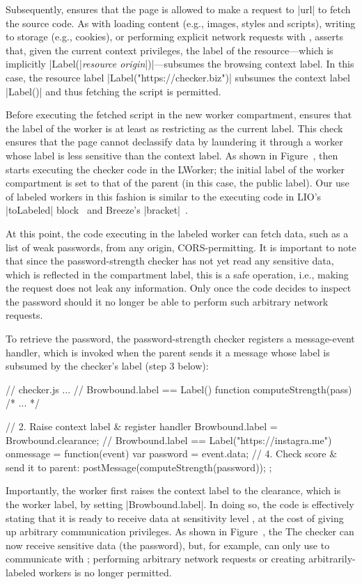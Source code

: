Subsequently, \sys{} ensures that the page is allowed to make
a request to \js|url| to fetch the source code.
%
As with loading content (e.g., images, styles and scripts), writing to
storage (e.g., cookies), or performing explicit network requests with
\xhr{}, \sys{} asserts that, given the current context privileges, the
label of the resource---which is implicitly \js|Label(|\emph{resource
origin}\js|)|---subsumes the browsing context label.
%
In this case, the resource label \js|Label("https://checker.biz")|
subsumes the context label \js|Label()| and thus fetching the script
is permitted.

Before executing the fetched script in the new worker compartment, \sys{}
ensures that the label of the worker is at least as restricting as the
current label.
%
This check ensures that the page cannot declassify data by laundering
it through a worker whose label is less sensitive than the context
label.
%
\iffigures
As shown in Figure~, 
\fi
\sys{} then starts
executing the checker code in the LWorker; the initial label of the
worker compartment is set to that of the parent (in this case, the
public label).
%
Our use of labeled workers in this fashion is similar to the executing code in
LIO's \js|toLabeled| block~\cite{stefan:2011:flexible} and Breeze's
\js|bracket|~\cite{Breeze13}.
 
At this point, the code executing in the labeled worker can fetch
data, such as a list of weak passwords, from any origin,
CORS-permitting.
%
It is important to note that since the password-strength checker has
not yet read any sensitive data, which is reflected in the compartment
label, this is a safe operation, i.e., making the request does not
leak any information.
%
Only once the code decides to inspect the password should it no
longer be able to perform such arbitrary network requests.

To retrieve the password, the password-strength checker registers a
message-event handler, which is invoked when the parent sends it a
message whose label is subsumed by the checker's label (step 3 below):
\begin{jscode}
// checker.js ...
// Browbound.label == Label()
function computeStrength(pass) { /* ... */ }

// 2. Raise context label & register handler
Browbound.label = Browbound.clearance;
// Browbound.label == Label("https://instagra.me")
onmessage = function(event) {
  var password = event.data;
  // 4. Check score & send it to parent:
  postMessage(computeStrength(password));
};
\end{jscode}
%
Importantly, the worker first raises the context label to the
clearance, which is the worker label, by setting \js|Browbound.label|.
%
In doing so, the code is effectively stating that it is ready to
receive data at sensitivity level , at the cost of
giving up arbitrary communication privileges.
%
\iffigures
As shown in Figure~, the 
\else
The
\fi
checker can now receive
sensitive data (the password), but, for example, can only use \xhr{} to
communicate with ;
%
performing arbitrary network requests or creating arbitrarily-labeled
workers is no longer permitted.

